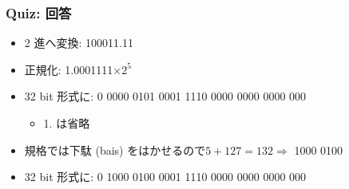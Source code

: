 \begin{frame}
\frametitle{Quiz: 回答}
  \begin{itemize}
\item 2 進へ変換: 100011.11
\item 正規化: 1.0001111$\times 2^5$
\item 32 bit 形式に: {\scriptsize 0 0000 0101 0001 1110 0000 0000 0000 000}
    \begin{itemize}
\item 1. は省略
    \end{itemize}
\item 規格\href{http://ieeexplore.ieee.org/xpl/mostRecentIssue.jsp?punumber=2355}{}では下駄 (bais) をはかせるので\(5+127=132\Rightarrow\) 1000 0100
\item 32 bit 形式に: {\scriptsize 0 1000 0100 0001 1110 0000 0000 0000 000}
  \end{itemize}
\end{frame}
